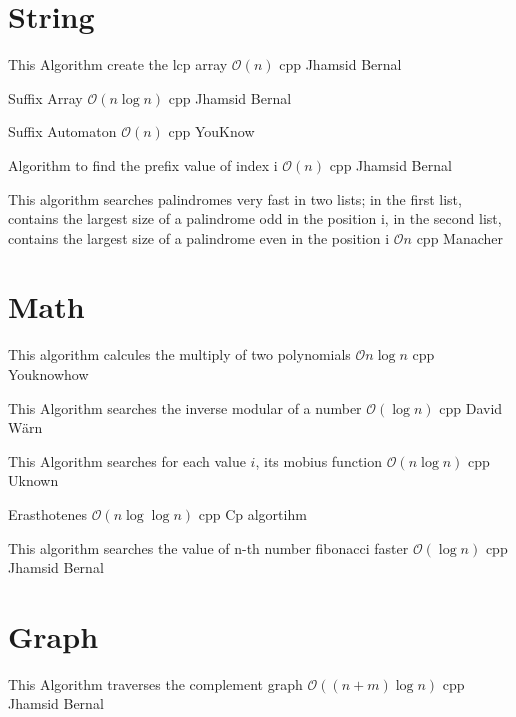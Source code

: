 \section{String}

{This Algorithm create the lcp array}
{$\mathcal{O}(n)$}
{cpp}{}
{Jhamsid Bernal}

{Suffix Array}
{$\mathcal{O}(n \log{n})$}
{cpp}{}
{Jhamsid Bernal}
\progress

{Suffix Automaton}
{$\mathcal{O}(n)$}
{cpp}{}
{YouKnow}
\progress

{Algorithm to find the prefix value of index i}
{$\mathcal{O}(n)$}
{cpp}{}
{Jhamsid Bernal}
\progress

{This algorithm searches palindromes very fast in two lists; in the first list, contains the largest size of a palindrome odd in the position i, in the second list, contains the largest size of a palindrome even in the position i}
{$\mathcal{O}{n}$}
{cpp}{}
{Manacher}
\section{Math}

{This algorithm calcules the multiply of two polynomials}
{$\mathcal{O}{n \log{n}}$}
{cpp}{}
{Youknowhow}

{This Algorithm searches the inverse modular of a number}
{$\mathcal{O}(\log{n})$}
{cpp}{}
{David Wärn}

{This Algorithm searches for each value $i$, its mobius function}
{$\mathcal{O}(n\log{n})$}
{cpp}{}
{Uknown}

{Erasthotenes}
{$\mathcal{O}(n \log{ \log{n}})$}
{cpp}{}
{Cp algortihm}

{This algorithm searches the value of n-th number fibonacci faster}
{$\mathcal{O}(\log{n})$}
{cpp}{}
{Jhamsid Bernal}

\section{Graph}

{This Algorithm traverses the complement graph}
{$\mathcal{O}((n + m)\log{n})$}
{cpp}{}
{Jhamsid Bernal}
\progress

